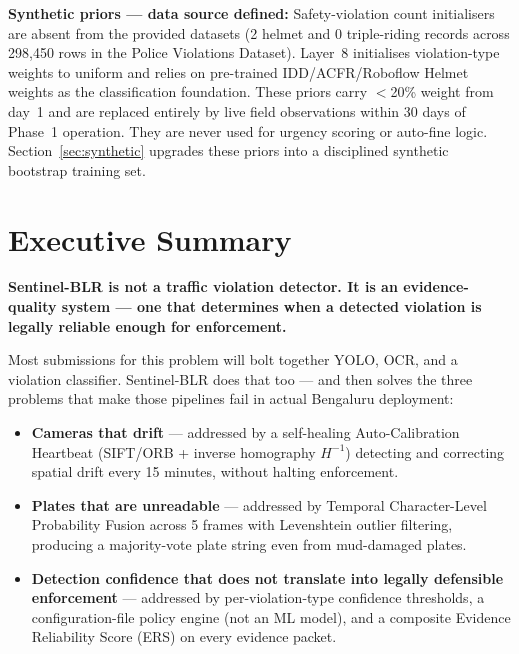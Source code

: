 \documentclass[11pt,a4paper]{article}
\begin{document}
\begin{callout}
\vspace{0.3em}
\textbf{Synthetic priors --- data source defined:} Safety-violation count initialisers are absent from the provided datasets (2 helmet and 0 triple-riding records across 298,450 rows in the Police Violations Dataset). Layer~8 initialises violation-type weights to uniform and relies on pre-trained IDD/ACFR/Roboflow Helmet weights as the classification foundation. These priors carry $<$20\% weight from day~1 and are replaced entirely by live field observations within 30 days of Phase~1 operation. They are never used for urgency scoring or auto-fine logic. Section~\ref{sec:synthetic} upgrades these priors into a disciplined synthetic bootstrap training set.

\end{callout}


\section{Executive Summary}

\textbf{Sentinel-BLR is not a traffic violation detector. It is an evidence-quality system --- one that determines when a detected violation is legally reliable enough for enforcement.}

Most submissions for this problem will bolt together YOLO, OCR, and a violation classifier. Sentinel-BLR does that too --- and then solves the three problems that make those pipelines fail in actual Bengaluru deployment:

\begin{itemize}[leftmargin=1.8em, itemsep=0.3em]
    \item \textbf{Cameras that drift} --- addressed by a self-healing Auto-Calibration Heartbeat (SIFT/ORB + inverse homography $H^{-1}$) detecting and correcting spatial drift every 15 minutes, without halting enforcement.
    \item \textbf{Plates that are unreadable} --- addressed by Temporal Character-Level Probability Fusion across 5 frames with Levenshtein outlier filtering, producing a majority-vote plate string even from mud-damaged plates.
    \item \textbf{Detection confidence that does not translate into legally defensible enforcement} --- addressed by per-violation-type confidence thresholds, a configuration-file policy engine (not an ML model), and a composite Evidence Reliability Score (ERS) on every evidence packet.
\end{itemize}
\end{document}
